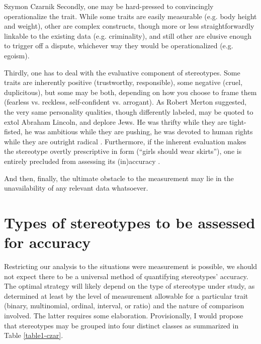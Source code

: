 \begin{artengenv}{Szymon Czarnik}
\enlargethispage{-1\baselineskip}
Secondly, one may be hard-pressed to convincingly operationalize the trait. While some traits are easily measurable (e.g. body height and weight), other are complex constructs, though more or less straightforwardly linkable to the existing data (e.g. criminality), and still other are elusive enough to trigger off a dispute, whichever way they would be operationalized (e.g. egoism).


Thirdly, one has to deal with the evaluative component of stereotypes. Some traits are inherently positive (trustworthy, responsible), some negative (cruel, duplicitous), but some may be both, depending on how you choose to frame them (fearless vs. reckless, self-confident vs. arrogant). As Robert Merton suggested, the very same personality qualities, though differently labeled, may be quoted to extol Abraham Lincoln, and deplore Jews. He was thrifty while they are tight-fisted, he was ambitious while they are pushing, he was devoted to human rights while they are outright radical
\parencite[][p.189]{allport_nature_1954}. %
 Furthermore, if the inherent evaluation makes the stereotype overtly prescriptive in form (``girls should wear skirts''), one is entirely precluded from assessing its (in)accuracy 
\parencite[][]{jussim_stereotype_2016}.%


And then, finally, the ultimate obstacle to the measurement may lie in the unavailability of any relevant data whatsoever.

\section{Types of stereotypes to be assessed for accuracy}
Restricting our analysis to the situations were measurement is possible, we should not expect there to be a universal method of quantifying stereotypes' accuracy. The optimal strategy will likely depend on the type of stereotype under study, as determined at least by the level of measurement allowable for a particular trait (binary, multinomial, ordinal, interval, or ratio) and the nature of comparison involved. The latter requires some elaboration. Provisionally, I would propose that stereotypes may be grouped into four distinct classes as summarized in Table \ref{table1-czar}.




\end{artengenv}
